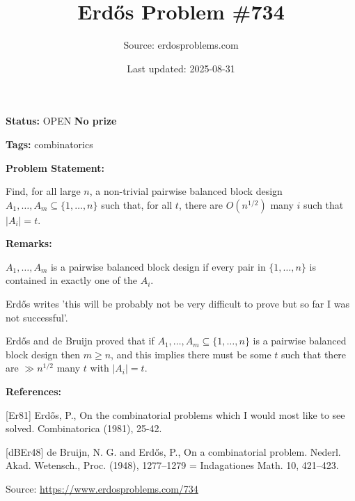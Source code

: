\documentclass{article}
\title{Erd\H{o}s Problem \#734}
\date{Last updated: 2025-08-31}
\author{Source: erdosproblems.com}
\begin{document}
\maketitle

\noindent\textbf{Status:} OPEN \quad \textbf{No prize}

\noindent\textbf{Tags:} combinatorics

\medskip
\noindent\textbf{Problem Statement:}

Find, for all large $n$, a non-trivial pairwise balanced block design $A_1,\ldots,A_m\subseteq \{1,\ldots,n\}$ such that, for all $t$, there are $O(n^{1/2})$ many $i$ such that $\lvert A_i\rvert=t$.

\bigskip
\noindent\textbf{Remarks:}

$A_1,\ldots,A_m$ is a pairwise balanced block design if every pair in $\{1,\ldots,n\}$ is contained in exactly one of the $A_i$. 

Erd\H{o}s \cite{Er81} writes 'this will be probably not be very difficult to prove but so far I was not successful'.

Erd\H{o}s and de Bruijn \cite{dBEr48} proved that if $A_1,\ldots,A_m\subseteq \{1,\ldots,n\}$ is a pairwise balanced block design then $m\geq n$, and this implies there must be some $t$ such that there are $\gg n^{1/2}$ many $t$ with $\lvert A_i\rvert=t$.

\bigskip
\noindent\textbf{References:}

[Er81] Erd\H{o}s, P., On the combinatorial problems which I would most like to see solved. Combinatorica (1981), 25-42.
 
 [dBEr48] de Bruijn, N. G. and Erd\H{o}s, P., On a combinatorial problem. Nederl. Akad. Wetensch., Proc. (1948), 1277--1279 = Indagationes Math. 10, 421--423.

\bigskip
\noindent\small{Source: \url{https://www.erdosproblems.com/734}}
\end{document}
